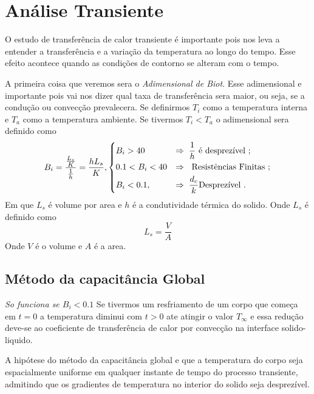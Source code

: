 \section{Análise Transiente}
O estudo de transferência de calor transiente é importante pois nos leva a entender a transferência
e a variação da temperatura ao longo do tempo. Esse efeito acontece quando as condições de contorno
se alteram com o tempo. \par
A primeira coisa que veremos sera o \emph{Adimensional de Biot}. Esse adimensional e importante pois
vai nos dizer qual taxa de transferência sera maior, ou seja, se a condução ou convecção
prevalecera. Se definirmos \(T_i\) como a temperatura interna e \(T_{a} \) como a temperatura
ambiente. Se tivermos \(T_{i} < T_{a} \) o adimensional sera definido como
\begin{align}
    B_{i} = \frac{\frac{L_{s} }{K}}{\frac{1}{h} } = \frac{h L_{s} }{K},
    \begin{dcases}
    B_{i} > 40 &\Rightarrow \; \frac{1}{h} \text{ é desprezível }  ;\\
    0.1 < B_{i} < 40 &\Rightarrow \;  \text{ Resistências Finitas }  ;\\
    B_{i} < 0.1, &\Rightarrow \; \frac{d_{c} }{k} \text{Desprezível } .
    \end{dcases}
\end{align}
Em que \(L_{s} \) é volume por area e \(h\) é a condutividade térmica do solido.  Onde \(L_{s} \)  é
definido como 
\begin{equation}
    L_{s} = \frac{V}{A}
\end{equation}
Onde \(V\) é o volume e \(A\) é a area. \par
\subsection{Método da capacitância Global}
\emph{So funciona se \(B_{i} < 0.1\) }
Se tivermos um resfriamento de um corpo que começa em \(t=0\) a temperatura diminui com \(t > 0\)
ate atingir o valor \(T_{\infty} \) e essa redução deve-se ao coeficiente de transferência de calor
por convecção na interface solido-liquido. \par

A hipótese do método da capacitância global e que a temperatura do corpo seja espacialmente uniforme
em qualquer instante de tempo do processo transiente, admitindo que os gradientes de temperatura no
interior do solido seja desprezível. \par


